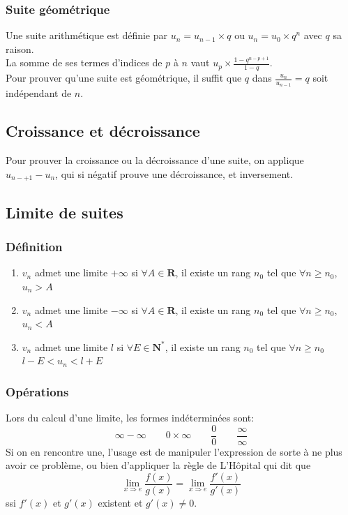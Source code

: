 \documentclass{article}
\begin{document}
\subsubsection{Suite géométrique}
    Une suite arithmétique est définie par $u_n = u_{n-1} \times q$ ou $u_n = u_0 \times q^n$ avec $q$ sa raison.\\
    La somme de ses termes d'indices de $p$ à $n$ vaut $u_p\times \frac{1-q^{n-p+1}}{1-q}$.\\
    Pour prouver qu'une suite est géométrique, il suffit que $q$ dans $\frac{u_n}{u_{n-1}} = q$ soit indépendant de $n$.


\subsection{Croissance et décroissance}
    Pour prouver la croissance ou la décroissance d'une suite, on applique \\$u_{n-+1} - u_n$, qui si négatif prouve une décroissance, et inversement.


\subsection{Limite de suites}

\subsubsection{Définition}
    \begin{enumerate}
        \item $v_n$ admet une limite $+\infty$ si $\forall A \in \mathbf{R}$, il existe un rang $n_0$ tel que $\forall n \ge n_0$, $u_n > A$
        \item $v_n$ admet une limite $-\infty$ si $\forall A \in \mathbf{R}$, il existe un rang $n_0$ tel que $\forall n \ge n_0$, $u_n < A$
        \item $v_n$ admet une limite $l$ si $\forall E \in \mathbf{N^*}$, il existe un rang $n_0$ tel que $\forall n \ge n_0$ $l-E<u_n<l+E$
    \end{enumerate}

\subsubsection{Opérations}
    Lors du calcul d'une limite, les formes indéterminées sont:
    \\$$\infty - \infty \qquad 0 \times \infty \qquad \frac{0}{0} \qquad \frac{\infty}{\infty}$$
    Si on en rencontre une, l'usage est de manipuler l'expression de sorte à ne plus avoir ce problème, ou bien d'appliquer la règle de L'Hôpital qui dit que $$\lim \limits_{x \Rightarrow e} \frac{f(x)}{g(x)} = \lim \limits_{x \Rightarrow e} \frac{f'(x)}{g'(x)}$$ ssi $f'(x)$ et $g'(x)$ existent et $g'(x) \ne 0$.
\end{document}
